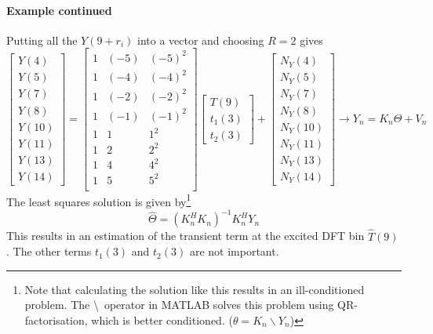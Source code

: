 \paragraph{Example continued}
Putting all the $Y(9+r_i)$ into a vector and choosing $R=2$ gives
\begin{equation*}
    \begin{bmatrix}
    Y(4)\\Y(5)\\Y(7)\\Y(8)\\Y(10)\\Y(11)\\Y(13)\\Y(14)
    \end{bmatrix} = 
    \begin{bmatrix}
    1 & (-5) & (-5)^2 \\
    1 & (-4) & (-4)^2 \\
    1 & (-2) & (-2)^2 \\
    1 & (-1) & (-1)^2 \\
    1 & 1 & 1^2 \\
    1 & 2 & 2^2 \\
    1 & 4 & 4^2 \\
    1 & 5 & 5^2 \\
    \end{bmatrix}
    \begin{bmatrix}
    T(9) \\ t_1(3) \\ t_2(3)
    \end{bmatrix} + 
    \begin{bmatrix}
    N_Y(4)\\N_Y(5)\\N_Y(7)\\N_Y(8)\\N_Y(10)\\N_Y(11)\\N_Y(13)\\N_Y(14)
    \end{bmatrix}
    \longrightarrow
    Y_n = K_n \Theta + V_n
\end{equation*}
The least squares solution is given by\footnote{Note that calculating the solution like this results in an ill-conditioned problem. The \textbackslash \ operator in MATLAB solves this problem using QR-factorisation, which is better conditioned. ($\theta = K_n \backslash Y_n$)}
\begin{equation*}
    \hat{\Theta} = (K_n^H K_n)^{-1}K_n^H Y_n
\end{equation*}
This results in an estimation of the transient term at the excited DFT bin $\hat{T}(9)$. The other terms $t_1(3)$ and $t_2(3)$ are not important.

